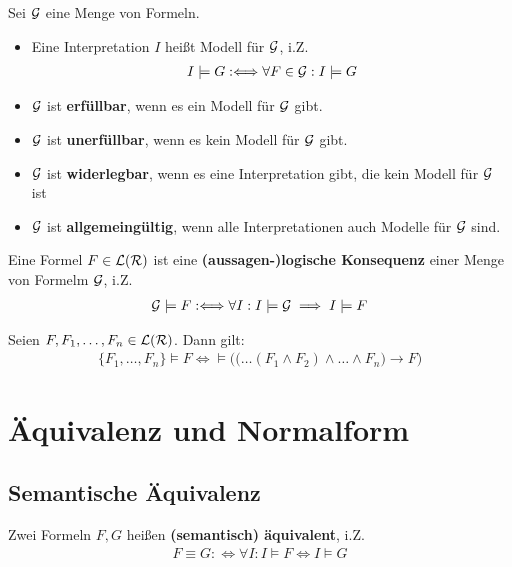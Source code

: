 \begin{definition}\label{def3.15}
	Sei $\mathcal{G}$ eine Menge von Formeln.
	\begin{itemize}
		\item Eine Interpretation $I$ heißt Modell für $\mathcal{G}$, i.Z.
		\begin{align*}
			I\models G:\Longleftrightarrow\forall F\in\mathcal{G}:I\models G
		\end{align*}
		\item $\mathcal{G}$ ist \textbf{erfüllbar}, wenn es ein Modell für $\mathcal{G}$ gibt.
		\item $\mathcal{G}$ ist \textbf{unerfüllbar}, wenn es kein Modell für $\mathcal{G}$ gibt.
		\item $\mathcal{G}$ ist \textbf{widerlegbar}, wenn es eine Interpretation gibt, die kein Modell für $\mathcal{G}$ ist
		\item $\mathcal{G}$ ist \textbf{allgemeingültig}, wenn alle Interpretationen auch Modelle für $\mathcal{G}$ sind.
	\end{itemize}
\end{definition}

\begin{definition}\label{def3.16}
	Eine Formel $F\in\mathcal{L}(\mathcal{R})$ ist eine \textbf{(aussagen-)logische Konsequenz} einer Menge von Formelm $\mathcal{G}$, i.Z.
	\begin{align*}
		\mathcal{G}\models F:\Longleftrightarrow\forall I:I\models\mathcal{G}\implies I\models F
	\end{align*}
\end{definition}

\begin{satz}\label{satz3.17}
	Seien $F,F_1,\ldots,F_n\in\mathcal{L}(\mathcal{R})$. Dann gilt:
	\begin{align*}
		\big\lbrace F_1,\ldots,F_n\big\rbrace\models F\Longleftrightarrow\models\Big(\big(\ldots(F_1\wedge F_2)\wedge\ldots\wedge F_n\big)\to F\Big)
	\end{align*}
\end{satz}

\section{Äquivalenz und Normalform}
\subsection{Semantische Äquivalenz}

\begin{definition}\label{def3.18}
	Zwei Formeln $F,G$ heißen \textbf{(semantisch) äquivalent}, i.Z.
	\begin{align*}
		F\equiv G:\Longleftrightarrow\forall I:I\models F\Longleftrightarrow I\models G
	\end{align*}
\end{definition}

